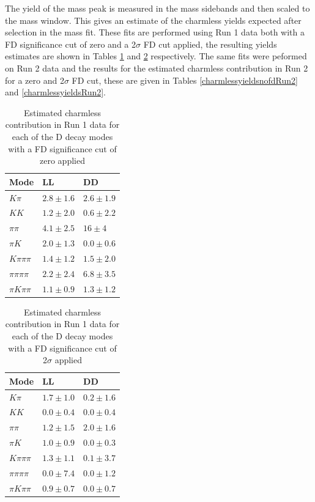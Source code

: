The yield of the \B mass peak is measured in the \D mass sidebands and then scaled to the \D mass window. This gives an estimate of the charmless yields expected after selection in the mass fit. These fits are performed using Run 1 data both with a FD significance cut of zero and a 2$\sigma$ FD cut applied, the resulting yields estimates are shown in Tables \ref{charmlessyieldsnofd} and \ref{charmlessyields} respectively. The same fits were peformed on Run 2 data and the results for the estimated charmless contribution in Run 2 for a zero and 2$\sigma$ FD cut, these are given in Tables \ref{charmlessyieldsnofdRun2} and \ref{charmlessyieldsRun2}.

\begin{table}[h] 
\centering 
\begin{tabular}{lll} 
\hline 
Mode & LL & DD \\ 
\hline 
$K\pi$ & $2.8 \pm 1.6$ & $2.6 \pm 1.9$ \\ 
$KK$ & $1.2 \pm 2.0$ & $0.6 \pm 2.2$ \\ 
$\pi\pi$ & $4.1 \pm 2.5$ & $16 \pm 4$ \\ 
$\pi K$ & $2.0 \pm 1.3$ & $0.0 \pm 0.6$ \\ 
$K\pi\pi\pi$ & $1.4 \pm 1.2$ & $1.5 \pm 2.0$ \\ 
$\pi\pi\pi\pi$ & $2.2 \pm 2.4$ & $6.8 \pm 3.5$ \\ 
$\pi K \pi\pi$ & $1.1 \pm 0.9$ & $1.3 \pm 1.2$ \\ 
\hline 
\end{tabular}
\caption{Estimated charmless contribution in Run 1 data for each of the D decay modes with a FD significance cut of zero applied} 
\label{charmlessyieldsnofd} 
\end{table}

\begin{table}[h]
\centering
\begin{tabular}{lll} 
\hline 
Mode & LL & DD \\ 
\hline 
$K\pi$ & $1.7 \pm 1.0$ & $0.2 \pm 1.6$ \\ 
$KK$ & $0.0 \pm 0.4$ & $0.0 \pm 0.4$ \\ 
$\pi\pi$ & $1.2 \pm 1.5$ & $2.0 \pm 1.6$ \\ 
$\pi K$ & $1.0 \pm 0.9$ & $0.0 \pm 0.3$ \\ 
$K\pi\pi\pi$ & $1.3 \pm 1.1$ & $0.1 \pm 3.7$ \\ 
$\pi\pi\pi\pi$ & $0.0 \pm 7.4$ & $0.0 \pm 1.2$ \\ 
$\pi K \pi\pi$ & $0.9 \pm 0.7$ & $0.0 \pm 0.7$ \\ 
\hline 
\end{tabular}
\caption{Estimated charmless contribution in Run 1 data for each of the D decay modes with a FD significance cut of 2$\sigma$ applied}
\label{charmlessyields}
\end{table}

